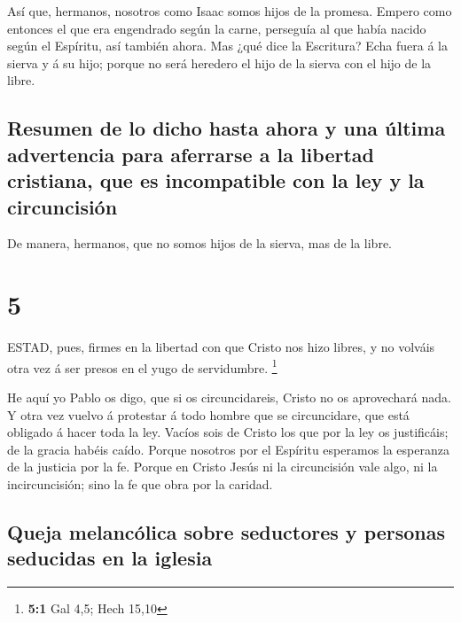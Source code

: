  Así que, hermanos, nosotros como Isaac somos hijos de la
promesa.  Empero como entonces el que era engendrado según
la carne, perseguía al que había nacido según el Espíritu, así también
ahora.  Mas ¿qué dice la Escritura? Echa fuera á la sierva
y á su hijo; porque no será heredero el hijo de la sierva con el hijo de
la libre.

\hypertarget{resumen-de-lo-dicho-hasta-ahora-y-una-uxfaltima-advertencia-para-aferrarse-a-la-libertad-cristiana-que-es-incompatible-con-la-ley-y-la-circuncisiuxf3n}{%
\subsection{Resumen de lo dicho hasta ahora y una última advertencia
para aferrarse a la libertad cristiana, que es incompatible con la ley y
la
circuncisión}\label{resumen-de-lo-dicho-hasta-ahora-y-una-uxfaltima-advertencia-para-aferrarse-a-la-libertad-cristiana-que-es-incompatible-con-la-ley-y-la-circuncisiuxf3n}}

 De manera, hermanos, que no somos hijos de la sierva, mas
de la libre.

\hypertarget{section-4}{%
\section{5}\label{section-4}}

 ESTAD, pues, firmes en la libertad con que Cristo nos hizo
libres, y no volváis otra vez á ser presos en el yugo de servidumbre.
\footnote{\textbf{5:1} Gal 4,5; Hech 15,10}

 He aquí yo Pablo os digo, que si os circuncidareis, Cristo
no os aprovechará nada.  Y otra vez vuelvo á protestar á
todo hombre que se circuncidare, que está obligado á hacer toda la ley.
 Vacíos sois de Cristo los que por la ley os justificáis; de
la gracia habéis caído.  Porque nosotros por el Espíritu
esperamos la esperanza de la justicia por la fe.  Porque en
Cristo Jesús ni la circuncisión vale algo, ni la incircuncisión; sino la
fe que obra por la caridad.

\hypertarget{queja-melancuxf3lica-sobre-seductores-y-personas-seducidas-en-la-iglesia}{%
\subsection{Queja melancólica sobre seductores y personas seducidas en
la
iglesia}\label{queja-melancuxf3lica-sobre-seductores-y-personas-seducidas-en-la-iglesia}}

